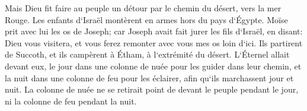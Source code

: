 \verse Mais Dieu fit faire au peuple un détour par le chemin du désert, vers la mer Rouge. Les enfants d`Israël montèrent en armes hors du pays d`Égypte. 
\verse Moïse prit avec lui les os de Joseph; car Joseph avait fait jurer les fils d`Israël, en disant: Dieu vous visitera, et vous ferez remonter avec vous mes os loin d`ici. 
\verse Ils partirent de Succoth, et ils campèrent à Étham, à l`extrémité du désert. 
\verse L`Éternel allait devant eux, le jour dans une colonne de nuée pour les guider dans leur chemin, et la nuit dans une colonne de feu pour les éclairer, afin qu`ils marchassent jour et nuit. 
\verse La colonne de nuée ne se retirait point de devant le peuple pendant le jour, ni la colonne de feu pendant la nuit. 

\chapter{}

